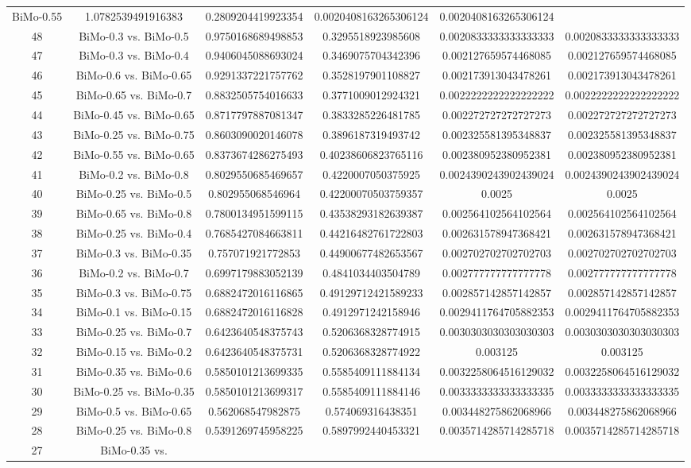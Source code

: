 \documentclass[a4paper,10pt]{article}
\begin{document}
\begin{landscape}
\begin{table}[!htp]
\begin{tabular}{cccccc}
BiMo-0.55&1.0782539491916383&0.2809204419923354&0.0020408163265306124&0.0020408163265306124\\48&BiMo-0.3 vs. BiMo-0.5&0.9750168689498853&0.3295518923985608&0.0020833333333333333&0.0020833333333333333\\47&BiMo-0.3 vs. BiMo-0.4&0.9406045088693024&0.3469075704342396&0.002127659574468085&0.002127659574468085\\46&BiMo-0.6 vs. BiMo-0.65&0.9291337221757762&0.3528197901108827&0.002173913043478261&0.002173913043478261\\45&BiMo-0.65 vs. BiMo-0.7&0.8832505754016633&0.3771009012924321&0.0022222222222222222&0.0022222222222222222\\44&BiMo-0.45 vs. BiMo-0.65&0.8717797887081347&0.3833285226481785&0.002272727272727273&0.002272727272727273\\43&BiMo-0.25 vs. BiMo-0.75&0.8603090020146078&0.3896187319493742&0.002325581395348837&0.002325581395348837\\42&BiMo-0.55 vs. BiMo-0.65&0.8373674286275493&0.40238606823765116&0.002380952380952381&0.002380952380952381\\41&BiMo-0.2 vs. BiMo-0.8&0.8029550685469657&0.4220007050375925&0.0024390243902439024&0.0024390243902439024\\40&BiMo-0.25 vs. BiMo-0.5&0.802955068546964&0.42200070503759357&0.0025&0.0025\\39&BiMo-0.65 vs. BiMo-0.8&0.7800134951599115&0.43538293182639387&0.002564102564102564&0.002564102564102564\\38&BiMo-0.25 vs. BiMo-0.4&0.7685427084663811&0.44216482761722803&0.002631578947368421&0.002631578947368421\\37&BiMo-0.3 vs. BiMo-0.35&0.757071921772853&0.44900677482653567&0.002702702702702703&0.002702702702702703\\36&BiMo-0.2 vs. BiMo-0.7&0.6997179883052139&0.4841034403504789&0.002777777777777778&0.002777777777777778\\35&BiMo-0.3 vs. BiMo-0.75&0.6882472016116865&0.49129712421589233&0.002857142857142857&0.002857142857142857\\34&BiMo-0.1 vs. BiMo-0.15&0.6882472016116828&0.4912971242158946&0.0029411764705882353&0.0029411764705882353\\33&BiMo-0.25 vs. BiMo-0.7&0.6423640548375743&0.5206368328774915&0.0030303030303030303&0.0030303030303030303\\32&BiMo-0.15 vs. BiMo-0.2&0.6423640548375731&0.5206368328774922&0.003125&0.003125\\31&BiMo-0.35 vs. BiMo-0.6&0.5850101213699335&0.5585409111884134&0.0032258064516129032&0.0032258064516129032\\30&BiMo-0.25 vs. BiMo-0.35&0.5850101213699317&0.5585409111884146&0.0033333333333333335&0.0033333333333333335\\29&BiMo-0.5 vs. BiMo-0.65&0.562068547982875&0.574069316438351&0.003448275862068966&0.003448275862068966\\28&BiMo-0.25 vs. BiMo-0.8&0.5391269745958225&0.5897992440453321&0.0035714285714285718&0.0035714285714285718\\27&BiMo-0.35 vs. 
\end{tabular}
\end{table}
\end{landscape}
\end{document}
